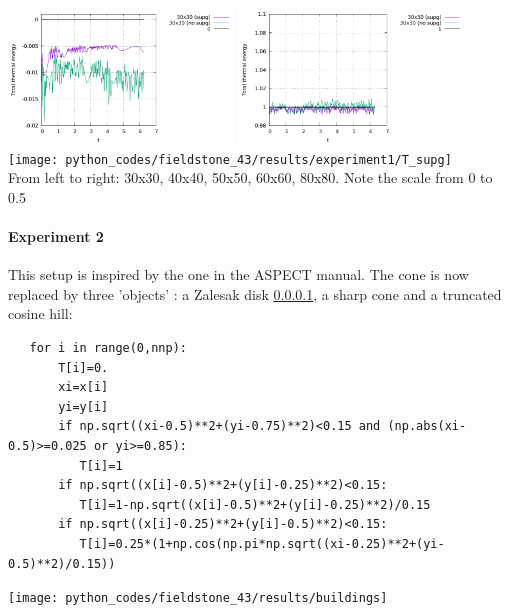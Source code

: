 \begin{center}
\includegraphics[width=6cm]{python_codes/fieldstone_43/results/experiment1/Tmin_supg}
\includegraphics[width=6cm]{python_codes/fieldstone_43/results/experiment1/Tmax_supg}\\
\texttt{[image: python\_codes/fieldstone\_43/results/experiment1/T\_supg]}\\
{\captionfont From left to right: 30x30, 40x40, 50x50, 60x60, 80x80. Note the scale from 0 to 0.5}
\end{center}

\paragraph{Experiment 2}

This setup is inspired by the one in the ASPECT manual. The cone is now replaced by three 
'objects' : a Zalesak disk \ref{}, a sharp cone and a truncated cosine hill:

\begin{lstlisting}
   for i in range(0,nnp):
       T[i]=0.
       xi=x[i]
       yi=y[i]
       if np.sqrt((xi-0.5)**2+(yi-0.75)**2)<0.15 and (np.abs(xi-0.5)>=0.025 or yi>=0.85):
          T[i]=1
       if np.sqrt((x[i]-0.5)**2+(y[i]-0.25)**2)<0.15:
          T[i]=1-np.sqrt((x[i]-0.5)**2+(y[i]-0.25)**2)/0.15
       if np.sqrt((x[i]-0.25)**2+(y[i]-0.5)**2)<0.15:
          T[i]=0.25*(1+np.cos(np.pi*np.sqrt((xi-0.25)**2+(yi-0.5)**2)/0.15))
\end{lstlisting}

\begin{center}
\texttt{[image: python\_codes/fieldstone\_43/results/buildings]}
\end{center}

